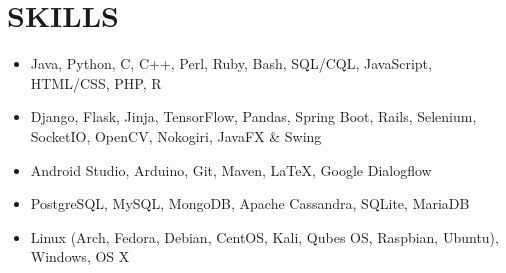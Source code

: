 \documentclass[11pt,letterpaper]{article}
\begin{document}
  \bigskip


  \section*{SKILLS}

  \begin{itemize}
    \item{
      {}
      Java, Python, C, C++, Perl, Ruby, Bash, SQL/CQL, JavaScript, HTML/CSS, PHP, R
    }

    \item{
      {}
      Django, Flask, Jinja, TensorFlow, Pandas, Spring Boot, Rails, Selenium, SocketIO, OpenCV, Nokogiri, JavaFX \& Swing
    }

    \item{
      {}
      Android Studio, Arduino, Git, Maven, \LaTeX, Google Dialogflow
    }

    \item{
      {}
      PostgreSQL, MySQL, MongoDB, Apache Cassandra, SQLite, MariaDB
    }

    \item{
      {}
      Linux (Arch, Fedora, Debian, CentOS, Kali, Qubes OS, Raspbian, Ubuntu), Windows, OS X
    }
  \end{itemize}
\end{document}
